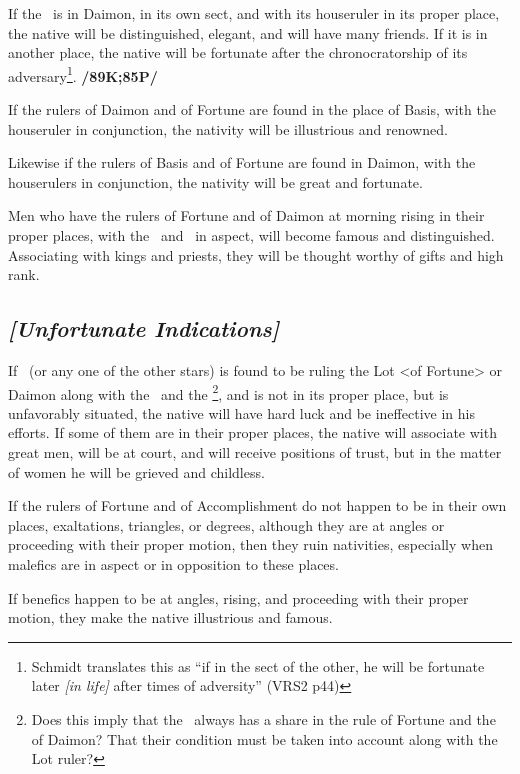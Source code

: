If the \Sun\, is in Daimon, in its own sect, and with its houseruler in its proper place, the native will be distinguished, elegant, and will have many friends. If it is in another place, the native will be fortunate after the chronocratorship of its adversary\footnote{Schmidt translates this as ``if in the sect of the other, he will be fortunate later \textsl{[in life]} after times of adversity'' (VRS2 p44)}. \textbf{/89K;85P/}

If the rulers of Daimon and of Fortune are found in the place of Basis, with the houseruler in conjunction, the nativity will be illustrious and renowned. 

Likewise if the rulers of Basis and of Fortune are found in Daimon, with the houserulers in conjunction, the nativity will be great and fortunate. 

Men who have the rulers of Fortune and of Daimon at morning rising in their proper places, with the \Sun\, and \Moon\, in aspect, will become famous and distinguished. Associating with kings and priests, they will be thought worthy of gifts and high rank. 

\subsection{\textit{[Unfortunate Indications]}}
If \Venus\, (or any one of the other stars) is found to be ruling the Lot <of Fortune> or Daimon along with the \Sun\, and the \Moon\footnote{Does this imply that the \Moon\, always has a share in the rule of Fortune and the \Sun\, of Daimon? That their condition must be taken into account along with the Lot ruler?}, and is not in its proper place, but is unfavorably situated, the native will have hard luck and be ineffective in his efforts. If some of them are in their proper places, the native will associate with great men, will be at court, and will receive positions of trust, but in the matter of women he will be grieved and childless.

If the rulers of Fortune and of Accomplishment  do not happen to be in their own places, exaltations, triangles, or degrees, although they are at angles or proceeding with their proper motion, then they ruin nativities, especially when malefics are in aspect or in opposition to these places. 

If benefics happen to be at angles, rising, and proceeding with their proper motion, they make the native illustrious and famous. 

